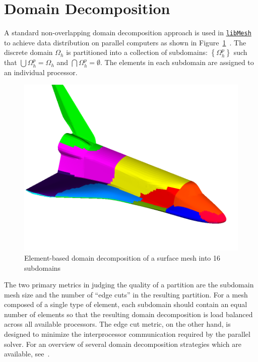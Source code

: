 \documentclass[global,twocolumn,final]{svjour}
\newcommand{\libMesh}{\href{http://libmesh.sourceforge.net}{\texttt{lib\-Mesh}}}
\begin{document}
\section{Domain Decomposition\label{sec:dd}}
A standard non-overlapping domain decomposition approach is used in
\libMesh{} to achieve data distribution on parallel computers as shown
in Figure~\ref{fig:orbiter_dd}~\cite{carey_gridbook}.  The discrete
domain $\Omega_h$ is partitioned into a collection of subdomains:
$\left\{\Omega_h^p\right\}$ such that $\bigcup\Omega_h^p=\Omega_h$ and
$\bigcap\Omega_h^p=\emptyset$. The elements in each subdomain are
assigned to an individual processor.
\begin{figure}
  \begin{center}
    \includegraphics[width=\columnwidth]{figures/orbiter_surface}
    \caption{Element-based domain decomposition of a surface mesh
      into 16 subdomains\label{fig:orbiter_dd}}
  \end{center}
\end{figure}
The two primary metrics in judging the quality of a partition are the
subdomain mesh size and the number of ``edge cuts'' in the resulting
partition.  For a mesh composed of a single type of element,
each subdomain should contain an equal number of elements so that the
resulting domain
decomposition is load balanced across all available processors.  The
edge cut metric, on the other hand, is designed to minimize the
interprocessor communication required by the parallel solver.
For an overview of several domain decomposition strategies
which are available, see~\cite{iqbal_carey_2005,ZoltanOverviewArticle}.
\end{document}
